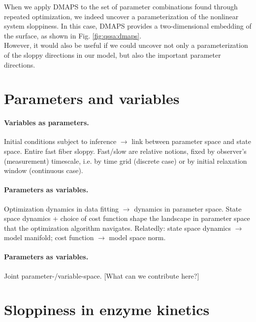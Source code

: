 \documentclass{article}
\begin{document}

When we apply DMAPS to the set of parameter combinations found through
repeated optimization, we indeed uncover a parameterization of the
nonlinear system sloppiness. In this case, DMAPS provides a
two-dimensional embedding of the surface, as shown in
Fig. \ref{fig:qssa:dmaps}. \\

However, it would also be useful if we could uncover not only a
parameterization of the sloppy directions in our model, but also the
important parameter directions.


\section{Parameters and variables}

\paragraph{Variables as parameters.}
Initial conditions subject to inference $\rightarrow$ link between
parameter space and state space.  Entire fast fiber sloppy.  Fast/slow
are relative notions, fixed by observer's (measurement) timescale,
i.e. by time grid (discrete case) or by initial relaxation window
(continuous case).

\paragraph{Parameters as variables.}
Optimization dynamics in data fitting $\rightarrow$ dynamics in
parameter space. State space dynamics + choice of cost function shape
the landscape in parameter space that the optimization algorithm
navigates.  Relatedly: state space dynamics $\rightarrow$ model
manifold; cost function $\rightarrow$ model space norm.

\paragraph{Parameters as variables.}
Joint parameter-/variable-space.
[What can we contribute here?]


\section{Sloppiness in enzyme kinetics}
\label{s-enzyme}
\end{document}
